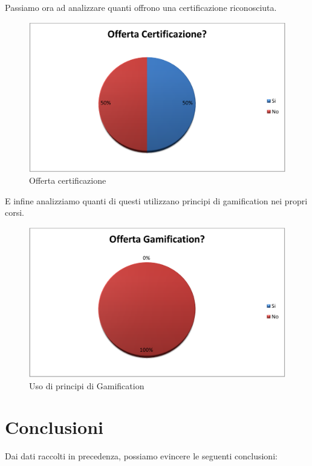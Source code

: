 Passiamo ora ad analizzare quanti offrono una certificazione riconosciuta.

\begin{figure}[H]
\centering
\includegraphics[scale=0.20]{images/cap4/concorrenza/offertaCertificazione.png}
\caption{Offerta certificazione}
\end{figure}

E infine analizziamo quanti di questi utilizzano principi di gamification nei propri corsi.

\begin{figure}[H]
\centering
\includegraphics[scale=0.20]{images/cap4/concorrenza/principiGamification.png}
\caption{Uso di principi di Gamification}
\end{figure}

\section{Conclusioni}

Dai dati raccolti in precedenza, possiamo evincere le seguenti conclusioni:

